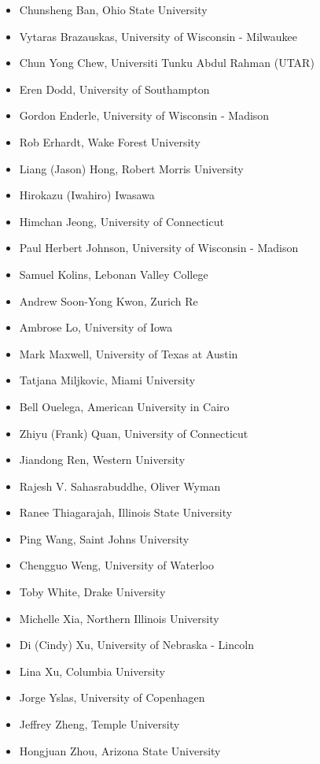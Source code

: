 \documentclass[]{book}
\providecommand{\tightlist}{%
  \setlength{\itemsep}{0pt}\setlength{\parskip}{0pt}}
\theoremstyle{definition}
\theoremstyle{definition}
\theoremstyle{definition}
\theoremstyle{remark}
\begin{document}
\begin{itemize}
\tightlist
\item
  Chunsheng Ban, Ohio State University
\item
  Vytaras Brazauskas, University of Wisconsin - Milwaukee
\item
  Chun Yong Chew, Universiti Tunku Abdul Rahman (UTAR)
\item
  Eren Dodd, University of Southampton
\item
  Gordon Enderle, University of Wisconsin - Madison
\item
  Rob Erhardt, Wake Forest University
\item
  Liang (Jason) Hong, Robert Morris University
\item
  Hirokazu (Iwahiro) Iwasawa
\item
  Himchan Jeong, University of Connecticut
\item
  Paul Herbert Johnson, University of Wisconsin - Madison
\item
  Samuel Kolins, Lebonan Valley College
\item
  Andrew Soon-Yong Kwon, Zurich Re
\item
  Ambrose Lo, University of Iowa
\item
  Mark Maxwell, University of Texas at Austin
\item
  Tatjana Miljkovic, Miami University
\item
  Bell Ouelega, American University in Cairo
\item
  Zhiyu (Frank) Quan, University of Connecticut
\item
  Jiandong Ren, Western University
\item
  Rajesh V. Sahasrabuddhe, Oliver Wyman
\item
  Ranee Thiagarajah, Illinois State University
\item
  Ping Wang, Saint Johns University
\item
  Chengguo Weng, University of Waterloo
\item
  Toby White, Drake University
\item
  Michelle Xia, Northern Illinois University
\item
  Di (Cindy) Xu, University of Nebraska - Lincoln
\item
  Lina Xu, Columbia University
\item
  Jorge Yslas, University of Copenhagen
\item
  Jeffrey Zheng, Temple University
\item
  Hongjuan Zhou, Arizona State University
\end{itemize}
\end{document}
